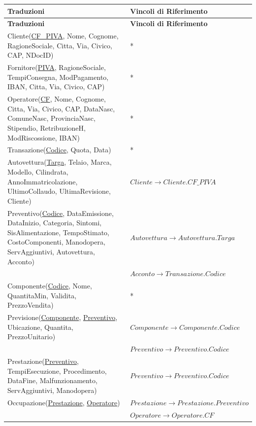 	\vspace{2ex}
		\begin{longtable}{| p{8cm} | p{6.5cm} |}
			\hline
			\textbf{Traduzioni} & \textbf{Vincoli di Riferimento} \\
			\hline
			\endfirsthead

			\hline
			\textbf{Traduzioni} & \textbf{Vincoli di Riferimento} \\
			\hline
			\endhead

			Cliente(\underline{CF\_PIVA}, Nome, Cognome, RagioneSociale, Citta, Via, Civico, CAP, NDocID) &
			* \\ \hline
			Fornitore(\underline{PIVA}, RagioneSociale, TempiConsegna, ModPagamento, IBAN, Citta, Via, Civico, CAP) &
			* \\ \hline
			Operatore(\underline{CF}, Nome, Cognome, Citta, Via, Civico, CAP, DataNasc, ComuneNasc, ProvinciaNasc, Stipendio, RetribuzioneH, ModRiscossione, IBAN) &
			* \\ \hline
			Transazione(\underline{Codice}, Quota, Data) &
			* \\ \hline
			Autovettura(\underline{Targa}, Telaio, Marca, Modello, Cilindrata, AnnoImmatricolazione, UltimoCollaudo, UltimaRevisione, Cliente) &
			$Cliente \rightarrow Cliente.CF\_PIVA$ \\ 
			\hline
			Preventivo(\underline{Codice}, DataEmissione, DataInizio, Categoria, Sintomi, SisAlimentazione, TempoStimato, CostoComponenti, Manodopera, ServAggiuntivi, Autovettura, Acconto) &
			$Autovettura \rightarrow Autovettura.Targa$ \\
			& $Acconto \rightarrow Transazione.Codice$ \\
			\hline
			Componente(\underline{Codice}, Nome, QuantitaMin, Validita, PrezzoVendita) &
			* \\ \hline
			Previsione(\underline{Componente}, \underline{Preventivo}, Ubicazione, Quantita, PrezzoUnitario) &
			$Componente \rightarrow Componente.Codice$ \\
			& $Preventivo \rightarrow Preventivo.Codice$ \\
			\hline
			Prestazione(\underline{Preventivo}, TempiEsecuzione, Procedimento, DataFine, Malfunzionamento, ServAggiuntivi, Manodopera) &
			$Preventivo \rightarrow Preventivo.Codice$ \\
			\hline
			Occupazione(\underline{Prestazione}, \underline{Operatore}) &
			$Prestazione \rightarrow Prestazione.Preventivo$ \\
			& $Operatore \rightarrow Operatore.CF$ \\

\end{longtable}
